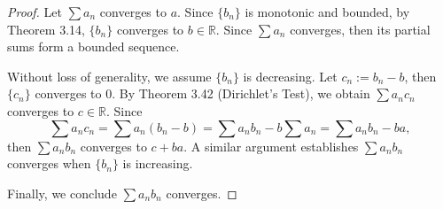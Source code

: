 \begin{Exercise}
	\begin{proof}
		Let $\sum a_n$ converges to $a$. Since $\{b_n\}$ is monotonic and bounded, by Theorem 3.14, $\{b_n\}$ converges to $b\in\mathbb{R}$. Since $\sum a_n$ converges, then its partial sums form a bounded sequence.
		
		Without loss of generality, we assume $\{b_n\}$ is decreasing. Let $c_n := b_n-b$, then $\{c_n\}$ converges to $0$. By Theorem 3.42 (Dirichlet's Test), we obtain $\sum a_n c_n$ converges to $c\in\mathbb{R}$. Since
		$$
		\sum a_n c_n
		= \sum a_n (b_n-b)
		= \sum a_n b_n - b\sum a_n
		= \sum a_n b_n - b a,
		$$
		then $\sum a_n b_n$ converges to $c+b a$. A similar argument establishes $\sum a_n b_n$ converges when $\{b_n\}$ is increasing.
		
		Finally, we conclude $\sum a_n b_n$ converges.
	\end{proof}
\end{Exercise}